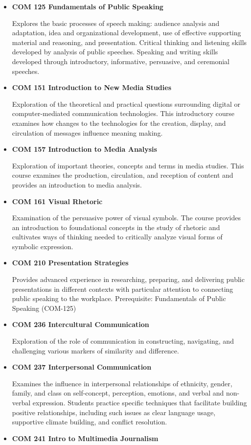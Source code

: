 \documentclass[
  letterpaper,
]{scrbook}
\begin{document}
\begin{itemize}
\item
  \textbf{COM 125 Fundamentals of Public Speaking}

  Explores the basic processes of speech making: audience analysis and
  adaptation, idea and organizational development, use of effective
  supporting material and reasoning, and presentation. Critical thinking
  and listening skills developed by analysis of public speeches.
  Speaking and writing skills developed through introductory,
  informative, persuasive, and ceremonial speeches.  
\item
  \textbf{COM 151 Introduction to New Media Studies}

  Exploration of the theoretical and practical questions surrounding
  digital or computer-mediated communication technologies. This
  introductory course examines how changes to the technologies for the
  creation, display, and circulation of messages influence meaning
  making.
\item
  \textbf{COM 157 Introduction to Media Analysis}

  Exploration of important theories, concepts and terms in media
  studies. This course examines the production, circulation, and
  reception of content and provides an introduction to media analysis.
\item
  \textbf{COM 161 Visual Rhetoric}

  Examination of the persuasive power of visual symbols. The course
  provides an introduction to foundational concepts in the study of
  rhetoric and cultivates ways of thinking needed to critically analyze
  visual forms of symbolic expression.
\item
  \textbf{COM 210 Presentation Strategies}

  Provides advanced experience in researching, preparing, and delivering
  public presentations in different contexts with particular attention
  to connecting public speaking to the workplace. Prerequisite:
  Fundamentals of Public Speaking (COM-125)
\item
  \textbf{COM 236 Intercultural Communication}

  Exploration of the role of communication in constructing, navigating,
  and challenging various markers of similarity and difference.
\item
  \textbf{COM 237 Interpersonal Communication}

  Examines the influence in interpersonal relationships of ethnicity,
  gender, family, and class on self-concept, perception, emotions, and
  verbal and non-verbal expression. Students practice specific
  techniques that facilitate building positive relationships, including
  such issues as clear language usage, supportive climate building, and
  conflict resolution.
\item
  \textbf{COM 241 Intro to Multimedia Journalism}


\end{itemize}
\end{document}
